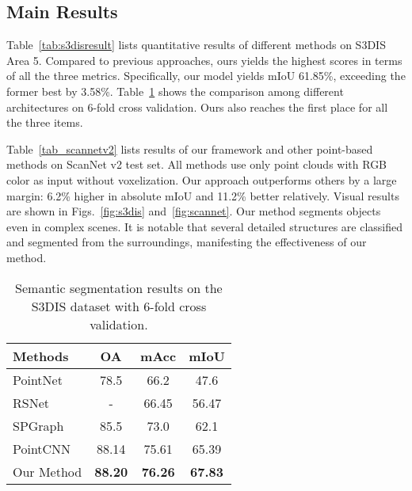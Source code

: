 \documentclass[10pt,twocolumn,letterpaper]{article}
\begin{document}
\subsection{Main Results}
Table~\ref{tab:s3disresult} lists quantitative results of different methods on S3DIS Area 5.
Compared to previous approaches, ours yields the highest scores in terms of all the three metrics. Specifically, our model yields mIoU 61.85\%, exceeding the former best by 3.58\%.
Table~\ref{tab:s3disresult2} shows the comparison among different architectures on 6-fold cross validation. Ours also reaches the first place for all the three items.

Table~\ref{tab_scannetv2} lists results of our framework and other point-based methods on ScanNet v2 test set.
All methods use only point clouds with RGB color as input without voxelization.
Our approach outperforms others by a large margin: 6.2\% higher in absolute mIoU and 11.2\% better relatively. Visual results are shown in Figs.~\ref{fig:s3dis} and~\ref{fig:scannet}.
Our method segments objects even in complex scenes.
It is notable that several detailed structures are classified and segmented from the surroundings, manifesting the effectiveness of our method.

\begin{table}[t]
	\small
	\setlength{\tabcolsep}{5pt}
	\begin{center}
		\begin{tabular}{ l | c c c}
\toprule[1.0pt]
			Methods & OA & mAcc & mIoU\\
			\hline
			PointNet~\cite{pointnet} & 78.5 & 66.2 & 47.6\\
			RSNet~\cite{huang2018recurrent} & - & 66.45 & 56.47\\
			SPGraph~\cite{spg} & 85.5 & 73.0 & 62.1\\
			PointCNN~\cite{pointcnn} & 88.14 & 75.61 & 65.39\\
			\hline
			Our Method & \textbf{88.20} & \textbf{76.26} & \textbf{67.83}\\
\bottomrule[1.0pt]
		\end{tabular}
	\end{center}
	\vspace*{-1mm}
	\caption{Semantic segmentation results on the S3DIS dataset with 6-fold cross validation.}
	\label{tab:s3disresult2}
	\vspace*{-2mm}
\end{table}
\end{document}
